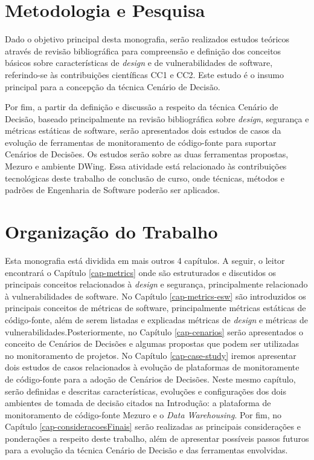 
\section{Metodologia e Pesquisa}

Dado o objetivo principal desta monografia, serão realizados estudos teóricos através de revisão bibliográfica para compreensão e definição dos conceitos básicos sobre características de \emph{design}  e de vulnerabilidades de software, referindo-se às contribuições científicas CC1 e CC2. Este estudo é o insumo principal para a concepção da técnica Cenário de Decisão.

%

Por fim, a  partir da definição e discussão a respeito da técnica Cenário de Decisão, baseado principalmente na revisão bibliográfica sobre \emph{design}, segurança e métricas estáticas de software, serão apresentados dois estudos de casos da evolução de ferramentas de monitoramento de código-fonte para suportar Cenários de Decisões. Os estudos serão sobre as duas ferramentas propostas, Mezuro e ambiente DWing.
%
Essa atividade está relacionado às contribuições tecnológicas deste trabalho de conclusão de curso, onde técnicas, métodos e padrões de Engenharia de Software poderão ser aplicados.



\section{Organização do Trabalho}

Esta monografia está dividida em mais outros 4 capítulos. A seguir, o leitor encontrará o Capítulo \ref{cap-metrics} onde são estruturados e discutidos os principais conceitos relacionados à \emph{design} e segurança, principalmente relacionado à vulnerabilidades de software. No Capítulo \ref{cap-metrics-esw} são introduzidos os principais conceitos de métricas de software, principalmente métricas estáticas de código-fonte, além de serem listadas e explicadas métricas de \emph{design} e métricas de vulnerabilidades.Posteriormente, no Capítulo \ref{cap-cenarios}  serão apresentados o conceito de Cenários de Decisões e algumas propostas que podem ser utilizadas no monitoramento de projetos. No Capítulo \ref{cap-case-study} iremos apresentar dois estudos de casos relacionados à evolução de plataformas de monitoramente de código-fonte para a adoção de Cenários de Decisões. Neste mesmo capítulo, serão definidas e descritas características, evoluções e configurações dos dois ambientes de tomada de decisão citados na Introdução: a plataforma de monitoramento de código-fonte Mezuro e o \emph{Data Warehousing}. Por fim, no Capítulo \ref{cap-consideracoesFinais} serão realizadas as principais considerações e ponderações a respeito deste trabalho, além de apresentar possíveis passos futuros para a evolução da técnica Cenário de Decisão e das ferramentas envolvidas.

